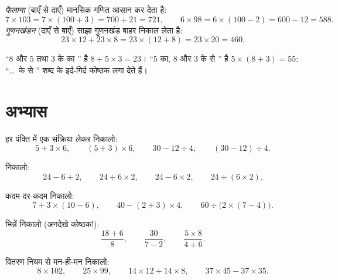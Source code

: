 \begin{example}[दोनों दिशाएँ]\label{ex:g7:priorities:distributivity}
\emph{फैलाना} (बाएँ से दाएँ) मानसिक गणित आसान कर देता है:
\[
7 \times 103 = 7 \times (100 + 3) = 700 + 21 = 721,
\qquad
6 \times 98 = 6 \times (100 - 2) = 600 - 12 = 588 .
\]
\emph{गुणनखंडन} (दाएँ से बाएँ) साझा गुणनखंड बाहर निकाल लेता है:
\[
23 \times 12 + 23 \times 8 = 23 \times (12 + 8) = 23 \times 20 = 460 .
\]
\end{example}

\begin{example}\label{ex:g7:priorities:words}
``$8$ और $5$ तथा $3$ के  का '' है $8 + 5 \times 3 =
23$। ``$5$ का, $8$ और $3$ के  से '' है
$5 \times (8 + 3) = 55$: ``\dots\ के  से '' शब्द
 के इर्द-गिर्द कोष्ठक लगा देते हैं।
\end{example}

\section{अभ्यास}

\begin{exercise}[$\star$]\label{exo:g7:priorities:1}
हर पंक्ति में एक संक्रिया लेकर निकालो:
\[
5 + 3 \times 6, \qquad
(5 + 3) \times 6, \qquad
30 - 12 \div 4, \qquad
(30 - 12) \div 4 .
\]
\end{exercise}

\begin{exercise}[$\star$]\label{exo:g7:priorities:2}
निकालो:
\[
24 - 6 + 2, \qquad
24 \div 6 \times 2, \qquad
24 - 6 \times 2, \qquad
24 \div (6 \times 2).
\]
\end{exercise}

\begin{exercise}[$\star$]\label{exo:g7:priorities:3}
कदम-दर-कदम निकालो:
\[
7 + 3 \times (10 - 6), \qquad
40 - (2 + 3) \times 4, \qquad
60 \div \bigl(2 \times (7 - 4)\bigr).
\]
\end{exercise}

\begin{exercise}[$\star$]\label{exo:g7:priorities:4}
भिन्नें निकालो (अनदेखे कोष्ठक!):
\[
\frac{18 + 6}{8}, \qquad
\frac{30}{7 - 2}, \qquad
\frac{5 \times 8}{4 + 6} .
\]
\end{exercise}

\begin{exercise}[$\star$]\label{exo:g7:priorities:5}
वितरण नियम से मन-ही-मन निकालो:
\[
8 \times 102, \qquad
25 \times 99, \qquad
14 \times 12 + 14 \times 8, \qquad
37 \times 45 - 37 \times 35 .
\]
\end{exercise}

